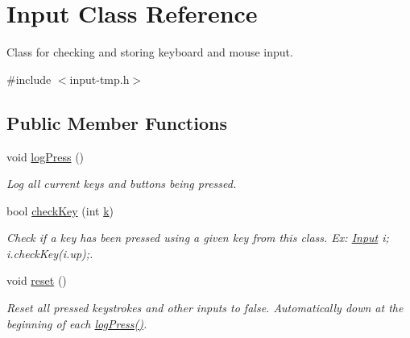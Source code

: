 \hypertarget{classInput}{}\section{Input Class Reference}
\label{classInput}


Class for checking and storing keyboard and mouse input.  




{\ttfamily \#include $<$input-\/tmp.\+h$>$}

\subsection*{Public Member Functions}
\begin{DoxyCompactItemize}
\item 
void \hyperlink{classInput_a7664a52377e4bda7524d288df481954b}{log\+Press} ()\hypertarget{classInput_a7664a52377e4bda7524d288df481954b}{}\label{classInput_a7664a52377e4bda7524d288df481954b}

\begin{DoxyCompactList}\small\item\em Log all current keys and buttons being pressed. \end{DoxyCompactList}\item 
bool \hyperlink{classInput_a2f5d21366e04e3ce200fe73c6c748dd8}{check\+Key} (int \hyperlink{classInput_aa069678fdc7c45c405c044ed8e45a379}{k})\hypertarget{classInput_a2f5d21366e04e3ce200fe73c6c748dd8}{}\label{classInput_a2f5d21366e04e3ce200fe73c6c748dd8}

\begin{DoxyCompactList}\small\item\em Check if a key has been pressed using a given key from this class. Ex\+: \hyperlink{classInput}{Input} i; i.\+check\+Key(i.\+up);. \end{DoxyCompactList}\item 
void \hyperlink{classInput_a8bec96dd53baf5ec754c199af3c957c8}{reset} ()\hypertarget{classInput_a8bec96dd53baf5ec754c199af3c957c8}{}\label{classInput_a8bec96dd53baf5ec754c199af3c957c8}

\begin{DoxyCompactList}\small\item\em Reset all pressed keystrokes and other inputs to false. Automatically down at the beginning of each \hyperlink{classInput_a7664a52377e4bda7524d288df481954b}{log\+Press()}. \end{DoxyCompactList}\end{DoxyCompactItemize}
